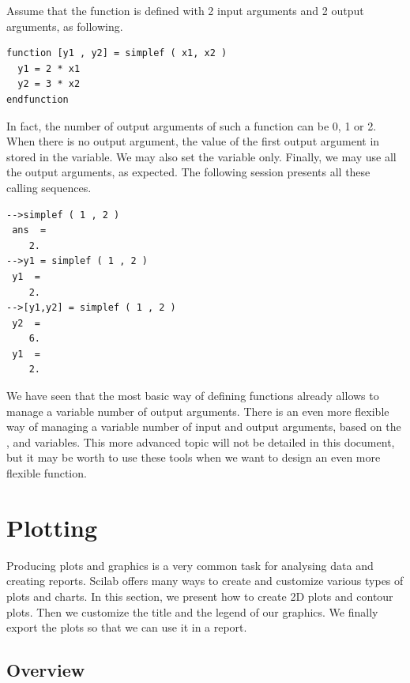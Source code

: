 Assume that the function  is defined with 
2 input arguments and 2 output arguments, as following.
\lstset{language=scilabscript}
\begin{lstlisting}
function [y1 , y2] = simplef ( x1, x2 )
  y1 = 2 * x1
  y2 = 3 * x2
endfunction
\end{lstlisting}

In fact, the number of output arguments of such a function can be 
0, 1 or 2. When there is no output argument, the value of the first output 
argument in stored in the  variable.
We may also set the variable  only. Finally, we may use 
all the output arguments, as expected. The following session presents 
all these calling sequences.
\lstset{language=scilabscript}
\begin{lstlisting}
-->simplef ( 1 , 2 )
 ans  =
    2.  
-->y1 = simplef ( 1 , 2 )
 y1  =
    2.  
-->[y1,y2] = simplef ( 1 , 2 )
 y2  =
    6.  
 y1  =
    2.  
\end{lstlisting}

We have seen that the most basic way of defining functions already 
allows to manage a variable number of output arguments.
There is an even more flexible way of managing a variable 
number of input and output arguments, based on the , 
 and  variables.
This more advanced topic will not be detailed in this 
document, but it may be worth to use these tools when we 
want to design an even more flexible function.





\section{Plotting}

Producing plots and graphics is a very common task for analysing 
data and creating reports. Scilab offers many ways to create and 
customize various types of plots and charts.
In this section, we present how to create 2D plots and contour plots.
Then we customize the title and the legend of our graphics.
We finally export the plots so that we can use it in a report.

\subsection{Overview}

